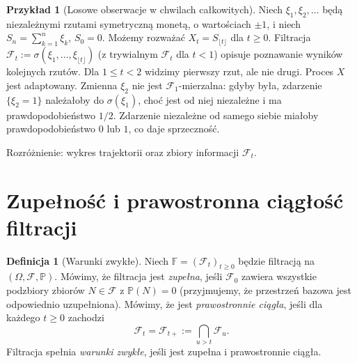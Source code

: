 \documentclass[11pt,a4paper,oneside]{report}
\numberwithin{equation}{chapter}
\theoremstyle{plain}
\theoremstyle{definition}
\newtheorem{definicja}{Definicja}[chapter]
\newtheorem{przyklad}{Przykład}[chapter]
\theoremstyle{remark}
\newcommand{\Prob}{\mathbb{P}}
\newcommand{\calF}{\mathcal{F}}
\begin{document}
\begin{przyklad}[Losowe obserwacje w chwilach całkowitych]
Niech $\xi_1,\xi_2,\ldots$ będą niezależnymi rzutami symetryczną
monetą, o wartościach $\pm1$, i niech
$S_n=\sum_{k=1}^n\xi_k$, $S_0=0$.
Możemy rozważać $X_t=S_{\lfloor t\rfloor}$ dla $t\ge0$.
Filtracja $\calF_t:=\sigma(\xi_1,\ldots,\xi_{\lfloor t\rfloor})$
(z trywialnym $\calF_t$ dla $t<1$) opisuje poznawanie
wyników kolejnych rzutów. Dla $1\le t<2$ widzimy
pierwszy rzut, ale nie drugi. Proces $X$ jest adaptowany.
Zmienna $\xi_2$ nie jest $\calF_1$-mierzalna:
gdyby była, zdarzenie $\{\xi_2=1\}$ należałoby do
$\sigma(\xi_1)$, choć jest od niej niezależne i ma
prawdopodobieństwo $1/2$. Zdarzenie niezależne od
samego siebie miałoby prawdopodobieństwo $0$ lub $1$,
co daje sprzeczność.
\end{przyklad}

\begin{center}
\par\smallskip\small Rozróżnienie: wykres trajektorii oraz zbiory informacji $\calF_t$.
\end{center}

\section{Zupełność i prawostronna ciągłość filtracji}
\begin{definicja}[Warunki zwykłe]
Niech $\mathbb F=(\calF_t)_{t\ge0}$ będzie filtracją
na $(\Omega,\calF,\Prob)$. Mówimy, że filtracja jest
\emph{zupełna}, jeśli $\calF_0$ zawiera wszystkie
podzbiory zbiorów $N\in\calF$ z $\Prob(N)=0$
(przyjmujemy, że przestrzeń bazowa jest odpowiednio uzupełniona).
Mówimy, że jest \emph{prawostronnie ciągła}, jeśli
dla każdego $t\ge0$ zachodzi
\[
\calF_t=\calF_{t+}:=\bigcap_{u>t}\calF_u.
\]
Filtracja spełnia \emph{warunki zwykłe}, jeśli jest
zupełna i prawostronnie ciągła.
\end{definicja}
\end{document}
